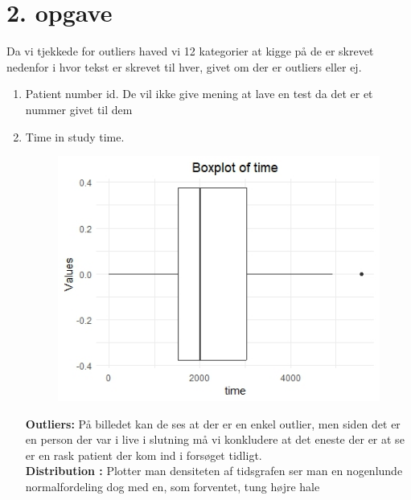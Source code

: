 \chapter{2. opgave}
Da vi tjekkede for outliers haved vi 12 kategorier at kigge på de er skrevet nedenfor i hvor tekst er skrevet til hver, givet om der er outliers eller ej.
\begin{enumerate}
\item Patient number id. \newline
De vil ikke give mening at lave en test da det er et nummer givet til dem 
\item  Time in study time.\\
\begin{figure}[h]
    \centering
    \includegraphics[width=0.6\linewidth]{Basses_kode/Billeder_duration/Outliers_time.jpeg}
\end{figure}
\textbf{Outliers: }På billedet kan de ses at der er en enkel outlier, men siden det er en person der var i live i slutning må vi konkludere at det eneste der er at se er en rask patient der kom ind i forsøget tidligt.\\
\textbf{Distribution :} Plotter man densiteten af tidsgrafen ser man en nogenlunde normalfordeling dog med en, som forventet, tung højre hale



\end{enumerate}
